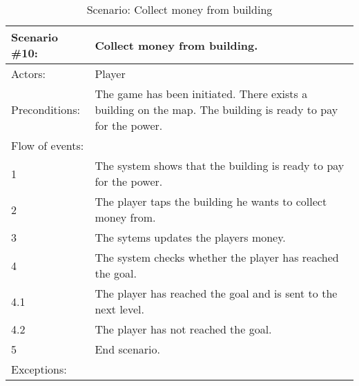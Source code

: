 \begin{table}
	\begin{tabular}{| l | p{10cm} |}
		\hline
		\rowcolor{lightgray}
		{\bf Scenario \#10:} & {\bf Collect money from building.} \\ \hline
		Actors: & Player \\ \hline
		Preconditions: & The game has been initiated. There exists a building on the map. The building is ready to pay for the power. \\ \hline
		Flow of events: & \\ \hline
		1 & The system shows that the building is ready to pay for the power. \\ \hline
		2 & The player taps the building he wants to collect money from. \\ \hline
		3 & The sytems updates the players money. \\ \hline
		4 & The system checks whether the player has reached the goal. \\ \hline
		4.1 & The player has reached the goal and is sent to the next level. \\ \hline
		4.2 & The player has not reached the goal. \\ \hline
		5 & End scenario. \\ \hline
		Exceptions: & \\ \hline
	\end{tabular}
\caption{Scenario: Collect money from building}
\end{table}
